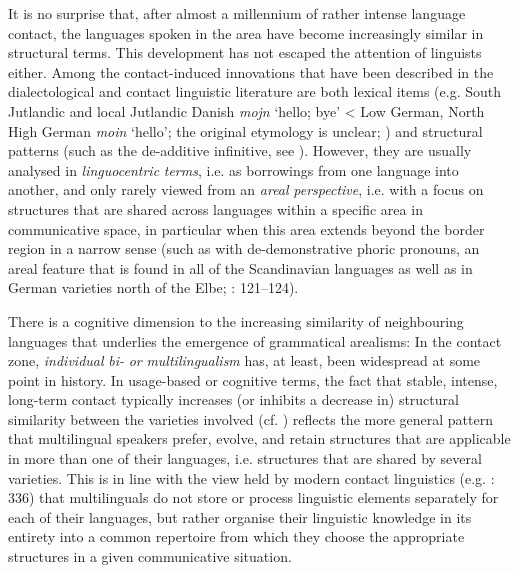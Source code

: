 \documentclass[output=paper]{langsci/langscibook}
\begin{document}
It is no surprise that, after almost a millennium of rather intense language contact, the languages spoken in the area have become increasingly similar in structural terms. This development has not escaped the attention of linguists either. Among the contact-induced innovations that have been described in the dialectological and contact linguistic literature are both lexical items (e.g. South Jutlandic and local Jutlandic Danish \textit{mojn} ‘hello; bye’ < Low German, North High German \textit{moin} ‘hello’; the original etymology is unclear; \citealt{Pedersen.1995}) and structural patterns (such as the de-additive infinitive, see ). However, they are usually analysed in \textit{linguocentric} \textit{terms}, i.e. as borrowings from one language into another, and only rarely viewed from an \textit{areal} \textit{perspective}, i.e. with a focus on structures that are shared across languages within a specific area in communicative space, in particular when this area extends beyond the border region in a narrow sense (such as with de-demonstrative phoric pronouns, an areal feature that is found in all of the Scandinavian languages as well as in German varieties north of the Elbe; \citealt{Hoder.2016a}: 121–124).


\label{sec:hoeder:3}

There is a cognitive dimension to the increasing similarity of neighbouring languages that underlies the emergence of grammatical arealisms: In the contact zone, \textit{individual} \textit{bi-} \textit{or} \textit{multilingualism} has, at least, been widespread at some point in history. In usage-based or cognitive terms, the fact that stable, intense, long-term contact typically increases (or inhibits a decrease in) structural similarity between the varieties involved (cf. \citealt{Matras.2010}) reflects the more general pattern that multilingual speakers prefer, evolve, and retain structures that are applicable in more than one of their languages, i.e. structures that are shared by several varieties. This is in line with the view held by modern contact linguistics (e.g. \citealt{Matras.2020}: 336) that multilinguals do not store or process linguistic elements separately for each of their languages, but rather organise their linguistic knowledge in its entirety into a common repertoire from which they choose the appropriate structures in a given communicative situation.
\end{document}
